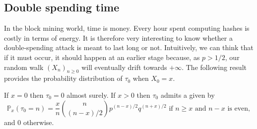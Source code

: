 \subsection{Double spending time}\label{sssec:double_spending_rw_dst}
In the block mining world, time is money. Every hour spent computing hashes is costly in terms of energy. It is therefore very interesting to know whether a double-spending attack is meant to last long or not. Intuitively, we can think that if it must occur, it should happen at an earlier stage because, as $p > 1/2$, our random walk $(X_n)_{n\geq0}$ will eventually drift towards $+\infty$. The following result provides the probability distribution of $\tau_0$ when $X_0 = x$.
\begin{theo}
If $x = 0$ then $\tau_0=0$ almost surely. If $x>0$ then $\tau_0$ admits a \pmf given by 
$$
\mathbb{P}_x(\tau_0 = n)=
\frac{x}{n}\binom{n}{(n-x) / 2}p^{(n-x) / 2}q^{(n
+x) / 2}\text{ if }n\geq x\text{ and }n-x\text{ is even},
$$
and $0$ otherwise.
\end{theo}
